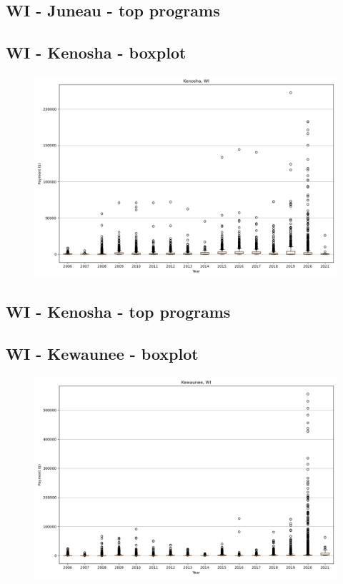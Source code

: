 \subsection*{WI - Juneau - top programs}

\newpage
\subsection*{WI - Kenosha - boxplot}
\begin{figure}[h]
\centering
\includegraphics[width=7in]{../output/boxplots/counties/Kenosha-WI_boxplot.png}
\end{figure}


\subsection*{WI - Kenosha - top programs}

\newpage
\subsection*{WI - Kewaunee - boxplot}
\begin{figure}[h]
\centering
\includegraphics[width=7in]{../output/boxplots/counties/Kewaunee-WI_boxplot.png}
\end{figure}


